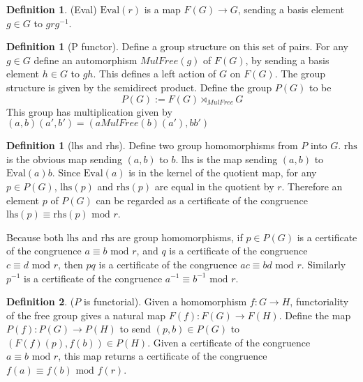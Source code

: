 \documentclass[11pt]{article} %
\theoremstyle{definition}
\theoremstyle{definition}
\theoremstyle{definition}
\theoremstyle{definition}
\theoremstyle{definition}
\newtheorem{defn}[theorem]{Definition}
\theoremstyle{definition}
\newtheorem{subdef}{Definition}[theorem]
\begin{document}

\begin{defn}(Eval)
  $\text{Eval}(r)$ is a map $F(G) \to G$, sending a basis element $g \in G$ to $grg^{-1}$.
\end{defn}

\begin{defn}[P functor]
  Define a group structure on this set of pairs.
  For any $g \in G$ define an automorphism $MulFree(g)$ of $F(G)$, by sending a basis
  element $h \in G$ to $gh$. This defines a left action of $G$ on $F(G)$. The group
  structure is given by the semidirect product. Define the group $P(G)$ to be
  \begin{equation}
  P(G) := F(G) \rtimes_{MulFree} G
  \end{equation}
  This group has multiplication given by $(a, b) (a', b') = (a MulFree(b)(a'), bb')$
\end{defn}

\begin{subdef}[lhs and rhs]
Define two group homomorphisms from $P$ into $G$. $\text{rhs}$ is the obvious map sending $(a, b)$ to $b$.
$\text{lhs}$ is the map sending $(a,b)$ to $\text{Eval}(a)b$.
Since $\text{Eval}(a)$ is in the kernel of the quotient map,
for any $p\in P(G)$, $\text{lhs}(p)$ and $\text{rhs}(p)$ are equal in the quotient by $r$.
Therefore an element $p$ of $P(G)$ can be regarded as a certificate of the congruence
$\text{lhs}(p) \equiv \text{rhs}(p) \text{ mod } r$.
\end{subdef}

Because both $\text{lhs}$ and $\text{rhs}$ are group homomorphisms, if $p \in P(G)$ is a certificate
of the congruence $a \equiv b \text{ mod } r$, and $q$ is a certificate of the congruence
$c \equiv d \text{ mod } r$, then $pq$ is a certificate of the congruence $ac \equiv bd \text{ mod } r$.
Similarly $p^{-1}$ is a certificate of the congruence $a^{-1} \equiv b^{-1} \text{ mod } r$.

\begin{subdef}($P$ is functorial).
  Given a homomorphism $f : G \to H$,
  functoriality of the free group gives a natural map $F(f) : F(G) \to F(H)$.
  Define the map $P(f) : P(G) \to P(H)$ to send $(p, b) \in P(G)$ to $(F(f)(p), f(b)) \in P(H)$.
  Given a certificate of the congruence $a \equiv b \text{ mod } r$, this map returns
  a certificate of the congruence $f(a) \equiv f(b) \text{ mod } f(r)$.
\end{subdef}
\end{document}
